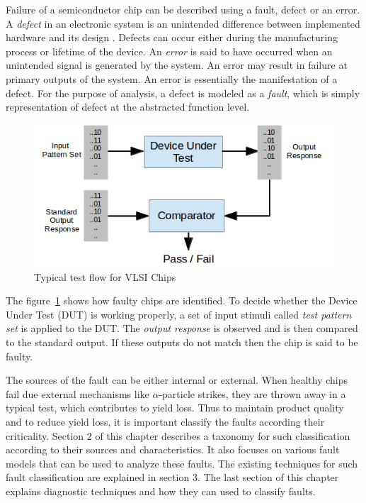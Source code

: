 Failure of a semiconductor chip can be described using a fault, defect or an error. A \emph{defect} in an electronic system is an unintended difference between implemented hardware and its design \cite{Agrawal2000}. Defects can occur either during the manufacturing process or lifetime of the device. An \emph{error} is said to have occurred when an unintended signal is generated by the system. An error may result in failure at primary outputs of the system. An error is essentially the manifestation of a defect. For the purpose of analysis, a defect is modeled as a \emph{fault}, which is simply representation of defect at the abstracted function level.

\begin{figure}[h]
  \begin{center}
    \captionsetup{justification=centering}
    \includegraphics[scale=0.75]{figures/vlsitesting.png}
    \caption{Typical test flow for VLSI Chips}
    \label{fig:vlsitesting}
  \end{center}
\end{figure}

The figure~\ref{fig:vlsitesting} shows how faulty chips are identified. To decide whether the Device Under Test (DUT) is working properly, a set of input stimuli called \emph{test pattern set} is applied to the DUT. The \emph{output response} is observed and is then compared to the standard output. If these outputs do not match then the chip is said to be faulty.

The sources of the fault can be either internal or external. When healthy chips fail due external mechanisms like $\alpha$-particle strikes, they are thrown away in a typical test, which contributes to yield loss. Thus to maintain product quality and to reduce yield loss, it is important classify the faults according their criticality. Section 2 of this chapter describes a taxonomy for such classification according to their sources and characteristics. It also focuses on various fault models that can be used to analyze these faults. The existing techniques for such fault classification are explained in section 3. The last section of this chapter explains diagnostic techniques and how they can used to classify faults.


